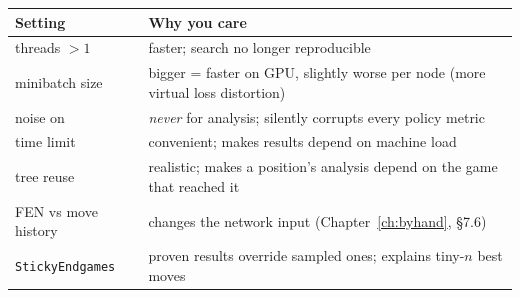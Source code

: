 \begin{center}
\begin{tabular}{@{}lp{9.2cm}@{}}
\toprule
Setting & Why you care \\
\midrule
threads $>1$ & faster; search no longer reproducible \\
minibatch size & bigger = faster on GPU, slightly worse per node (more virtual loss distortion) \\
noise on & \emph{never} for analysis; silently corrupts every policy metric \\
time limit & convenient; makes results depend on machine load \\
tree reuse & realistic; makes a position's analysis depend on the game that reached it \\
FEN vs move history & changes the network input (Chapter~\ref{ch:byhand}, §7.6) \\
\texttt{StickyEndgames} & proven results override sampled ones; explains tiny-$n$ best moves \\
\bottomrule
\end{tabular}
\end{center}

